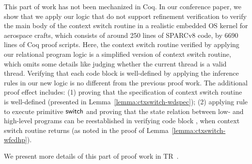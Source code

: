 {This part of work has not been mechanized in Coq. 
In our conference paper, we show that 
we apply our logic that do not support 
refinement verification to verify 
the main body of the context switch routine in 
a realistic embedded OS kernel for aerospace crafts, 
which consists of around 250 lines of SPARCv8 code, 
by 6690 lines of Coq proof scripts. Here, the 
context switch routine verified by applying our 
relational program logic is a 
simplified version of context switch routine, 
which omits some details like judging whether the 
current thread is a valid thread. 
Verifying that each code block is well-defined 
by applying the inference rules in our new logic is 
no different from the previous proof work. 
The additional proof effect includes: 
(1) proving that the specification of context 
switch routine is well-defined (presented in 
Lemma~\ref{lemma:ctxswitch-wdspec}); 
(2) applying  rule to execute 
primitive $\mathsf{switch}$ and proving that the state 
relation between low- and high-level programs 
can be reestablished in verifying code block 
\SwitchNewTask{}, when context switch routine 
returns (as noted in the proof of 
Lemma~\ref{lemma:ctxswitch-wfcdhp}). 

We present more details of this part of proof 
work in TR~\cite{coqimp}.
}
